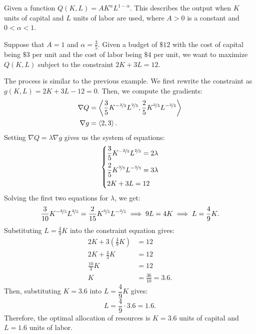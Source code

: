 \begin{example}
Given a function $Q(K, L) = A K^\alpha L^{1-\alpha}$.
This describes the output when $K$ units of capital and $L$ units of labor are used, where $A > 0$ is a constant and $0 < \alpha < 1$.

Suppose that $A = 1$ and $\alpha = \frac{3}{5}$. Given a budget of $\mathdollar 12$ with the cost of capital being $\mathdollar 3$ per unit and the cost of labor being $\mathdollar 4$ per unit, we want to maximize $Q(K, L)$ subject to the constraint $2K + 3L = 12$.

The process is similar to the previous example. We first rewrite the constraint as $g(K, L) = 2K + 3L - 12 = 0$. Then, we compute the gradients:
\begin{align*}
    \nabla Q &= \left\langle \frac{3}{5} K^{-\nicefrac{2}{5}} L^{\nicefrac{2}{5}}, \frac{2}{5} K^{\nicefrac{3}{5}} L^{-\nicefrac{3}{5}} \right\rangle \\
    \nabla g &= \left\langle 2, 3 \right\rangle.
\end{align*}
Setting $\nabla Q = \lambda \nabla g$ gives us the system of equations:
\[
    \left\{
    \begin{aligned}
        &\frac{3}{5} K^{-\nicefrac{2}{5}} L^{\nicefrac{2}{5}} = 2\lambda \\
        &\frac{2}{5} K^{\nicefrac{3}{5}} L^{-\nicefrac{3}{5}} = 3\lambda \\
        &2K + 3L = 12
    \end{aligned}
    \right.
\]
Solving the first two equations for $\lambda$, we get:
\[
    \frac{3}{10} K^{-\nicefrac{2}{5}} L^{\nicefrac{2}{5}} = \frac{2}{15} K^{\nicefrac{3}{5}} L^{-\nicefrac{3}{5}} \implies 9L = 4K \implies L = \frac{4}{9}K.
\]
Substituting $L = \frac{4}{9}K$ into the constraint equation gives:
\begin{align*}
    2K + 3\left(\frac{4}{9}K\right) &= 12 \\[0.5em]
    2K + \frac{4}{3}K &= 12 \\[0.5em]
    \frac{10}{3}K &= 12 \\[0.5em]
    K &= \frac{36}{10} = 3.6.
\end{align*}
Then, substituting $K = 3.6$ into $L = \dfrac{4}{9}K$ gives:
\[
    L = \frac{4}{9} \cdot 3.6 = 1.6.
\]
Therefore, the optimal allocation of resources is $K = 3.6$ units of capital and $L = 1.6$ units of labor.
\end{example}
